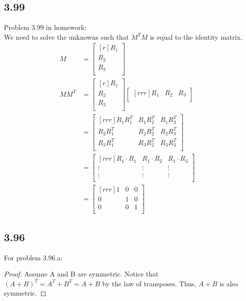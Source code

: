 \documentclass{report}
\theoremstyle{plain}
\theoremstyle{definition}
\theoremstyle{plain}
\begin{document}
\subsection{3.99}
Problem 3.99 in homework:\\
We need to solve the unknowns such that $M^TM$ is equal to the identity matrix.
	\begin{align*}
	M &= \begin{bmatrix}[r] R_1\\ R_2\\ R_3\\ \end{bmatrix}\\
	MM^T &= \begin{bmatrix}[r] R_1\\ R_2\\ R_3\\ \end{bmatrix}
	\begin{bmatrix}[rrr] R_1 & R_2 & R_3\\ \end{bmatrix}\\
	&=
	\begin{bmatrix}[rrr]
	R_1R_1^T & R_1R_2^T & R_1R_3^T\\
	R_2R_1^T & R_2R_2^T & R_2R_3^T\\
	R_3R_1^T & R_3R_2^T & R_3R_3^T\\
	\end{bmatrix}\\
	&=
	\begin{bmatrix}[rrr]
	R_1 \cdot R_1 & R_1 \cdot R_2 & R_1 \cdot R_3\\
	\vdots & \vdots & \vdots\\
	\vdots & \vdots & \vdots\\
	\end{bmatrix}\\
	&=
	\begin{bmatrix}[rrr]
	1 & 0 & 0\\
	0 & 1 & 0\\
	0 & 0 & 1\\
	\end{bmatrix}
	\end{align*}
\subsection{3.96}
For problem 3.96.a:\\
\begin{proof}
Assume A and B are symmetric. Notice that $(A+B)^T=A^T+B^T = A + B$ by the law of transposes. Thus, $A+B$ is also symmetric.
\end{proof}
\end{document}
